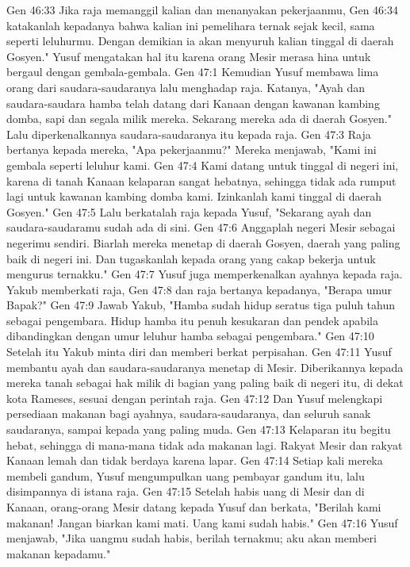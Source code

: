 Gen 46:33  Jika raja memanggil kalian dan menanyakan pekerjaanmu,
Gen 46:34  katakanlah kepadanya bahwa kalian ini pemelihara ternak sejak kecil, sama seperti leluhurmu. Dengan demikian ia akan menyuruh kalian tinggal di daerah Gosyen." Yusuf mengatakan hal itu karena orang Mesir merasa hina untuk bergaul dengan gembala-gembala.
Gen 47:1  Kemudian Yusuf membawa lima orang dari saudara-saudaranya lalu menghadap raja. Katanya, "Ayah dan saudara-saudara hamba telah datang dari Kanaan dengan kawanan kambing domba, sapi dan segala milik mereka. Sekarang mereka ada di daerah Gosyen." Lalu diperkenalkannya saudara-saudaranya itu kepada raja.
Gen 47:3  Raja bertanya kepada mereka, "Apa pekerjaanmu?" Mereka menjawab, "Kami ini gembala seperti leluhur kami.
Gen 47:4  Kami datang untuk tinggal di negeri ini, karena di tanah Kanaan kelaparan sangat hebatnya, sehingga tidak ada rumput lagi untuk kawanan kambing domba kami. Izinkanlah kami tinggal di daerah Gosyen."
Gen 47:5  Lalu berkatalah raja kepada Yusuf, "Sekarang ayah dan saudara-saudaramu sudah ada di sini.
Gen 47:6  Anggaplah negeri Mesir sebagai negerimu sendiri. Biarlah mereka menetap di daerah Gosyen, daerah yang paling baik di negeri ini. Dan tugaskanlah kepada orang yang cakap bekerja untuk mengurus ternakku."
Gen 47:7  Yusuf juga memperkenalkan ayahnya kepada raja. Yakub memberkati raja,
Gen 47:8  dan raja bertanya kepadanya, "Berapa umur Bapak?"
Gen 47:9  Jawab Yakub, "Hamba sudah hidup seratus tiga puluh tahun sebagai pengembara. Hidup hamba itu penuh kesukaran dan pendek apabila dibandingkan dengan umur leluhur hamba sebagai pengembara."
Gen 47:10  Setelah itu Yakub minta diri dan memberi berkat perpisahan.
Gen 47:11  Yusuf membantu ayah dan saudara-saudaranya menetap di Mesir. Diberikannya kepada mereka tanah sebagai hak milik di bagian yang paling baik di negeri itu, di dekat kota Rameses, sesuai dengan perintah raja.
Gen 47:12  Dan Yusuf melengkapi persediaan makanan bagi ayahnya, saudara-saudaranya, dan seluruh sanak saudaranya, sampai kepada yang paling muda.
Gen 47:13  Kelaparan itu begitu hebat, sehingga di mana-mana tidak ada makanan lagi. Rakyat Mesir dan rakyat Kanaan lemah dan tidak berdaya karena lapar.
Gen 47:14  Setiap kali mereka membeli gandum, Yusuf mengumpulkan uang pembayar gandum itu, lalu disimpannya di istana raja.
Gen 47:15  Setelah habis uang di Mesir dan di Kanaan, orang-orang Mesir datang kepada Yusuf dan berkata, "Berilah kami makanan! Jangan biarkan kami mati. Uang kami sudah habis."
Gen 47:16  Yusuf menjawab, "Jika uangmu sudah habis, berilah ternakmu; aku akan memberi makanan kepadamu."
